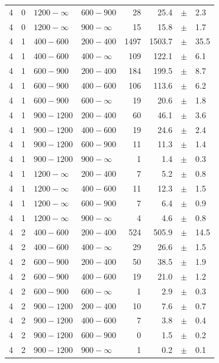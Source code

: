 \begin{table}[!h]
\begin{tabular}{rrllrrcl}
4 & 0 & $1200- \infty$ & $600-900$ &     28 &     25.4 &$\pm$&    2.3 \\
4 & 0 & $1200- \infty$ & $900-\infty$ &     15 &     15.8 &$\pm$&    1.7 \\
4\T & 1 & $ 400- 600$ & $200-400$ &   1497 &   1503.7 &$\pm$&   35.5 \\
4 & 1 & $ 400- 600$ & $400-\infty$ &    109 &    122.1 &$\pm$&    6.1 \\
4\T & 1 & $ 600- 900$ & $200-400$ &    184 &    199.5 &$\pm$&    8.7 \\
4 & 1 & $ 600- 900$ & $400-600$ &    106 &    113.6 &$\pm$&    6.2 \\
4 & 1 & $ 600- 900$ & $600-\infty$ &     19 &     20.6 &$\pm$&    1.8 \\
4\T & 1 & $ 900-1200$ & $200-400$ &     60 &     46.1 &$\pm$&    3.6 \\
4 & 1 & $ 900-1200$ & $400-600$ &     19 &     24.6 &$\pm$&    2.4 \\
4 & 1 & $ 900-1200$ & $600-900$ &     11 &     11.3 &$\pm$&    1.4 \\
4 & 1 & $ 900-1200$ & $900-\infty$ &      1 &      1.4 &$\pm$&    0.3 \\
4\T & 1 & $1200- \infty$ & $200-400$ &      7 &      5.2 &$\pm$&    0.8 \\
4 & 1 & $1200- \infty$ & $400-600$ &     11 &     12.3 &$\pm$&    1.5 \\
4 & 1 & $1200- \infty$ & $600-900$ &      7 &      6.4 &$\pm$&    0.9 \\
4 & 1 & $1200- \infty$ & $900-\infty$ &      4 &      4.6 &$\pm$&    0.8 \\
4\T & 2 & $ 400- 600$ & $200-400$ &    524 &    505.9 &$\pm$&   14.5 \\
4 & 2 & $ 400- 600$ & $400-\infty$ &     29 &     26.6 &$\pm$&    1.5 \\
4\T & 2 & $ 600- 900$ & $200-400$ &     50 &     38.5 &$\pm$&    1.9 \\
4 & 2 & $ 600- 900$ & $400-600$ &     19 &     21.0 &$\pm$&    1.2 \\
4 & 2 & $ 600- 900$ & $600-\infty$ &      1 &      2.9 &$\pm$&    0.3 \\
4\T & 2 & $ 900-1200$ & $200-400$ &     10 &      7.6 &$\pm$&    0.7 \\
4 & 2 & $ 900-1200$ & $400-600$ &      7 &      3.8 &$\pm$&    0.4 \\
4 & 2 & $ 900-1200$ & $600-900$ &      0 &      1.5 &$\pm$&    0.2 \\
4 & 2 & $ 900-1200$ & $900-\infty$ &      1 &      0.2 &$\pm$&    0.1 \\

\end{tabular}
\end{table}
